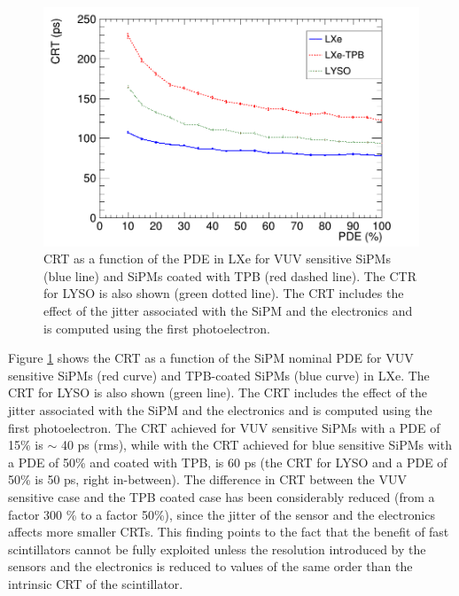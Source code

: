 \documentclass[review]{elsarticle}
\begin{document}
 \begin{figure}[!bhtp]
	\centering
	\includegraphics[scale=0.4]{../img/CTR_jitter_fixed_n.png}
	\caption{\label{fig.crt3} CRT as a function of the PDE in LXe for VUV sensitive SiPMs (blue line) and SiPMs coated with TPB (red dashed line). The CTR for LYSO is also shown (green dotted line). The CRT includes the
	effect of the jitter associated with the SiPM and the electronics and is computed using the first photoelectron.}
\end{figure}

Figure \ref{fig.crt3} shows the CRT as a function of the
 SiPM nominal PDE for VUV sensitive SiPMs (red curve) and TPB-coated SiPMs (blue curve) in LXe. The CRT for LYSO is also shown (green line). The CRT includes the
effect of the jitter associated with the SiPM and the electronics and is computed using the first photoelectron.
The CRT achieved for VUV sensitive SiPMs with a PDE of 15\% is $\sim$ 40 ps (rms), while with the CRT achieved for blue sensitive SiPMs with a PDE of 50\% and coated with TPB, is 60 ps (the CRT for LYSO and a PDE of 50\% is 50 ps, right in-between). The difference in CRT between the VUV sensitive case and the TPB coated case has been considerably reduced (from a factor 300 \% to a factor 50\%), since the jitter of the sensor and the electronics affects more smaller CRTs. This finding points to the fact that the benefit of fast scintillators cannot be fully exploited unless the resolution introduced by the sensors and the electronics is reduced to values of the same order than the intrinsic CRT of the scintillator. 
\end{document}
